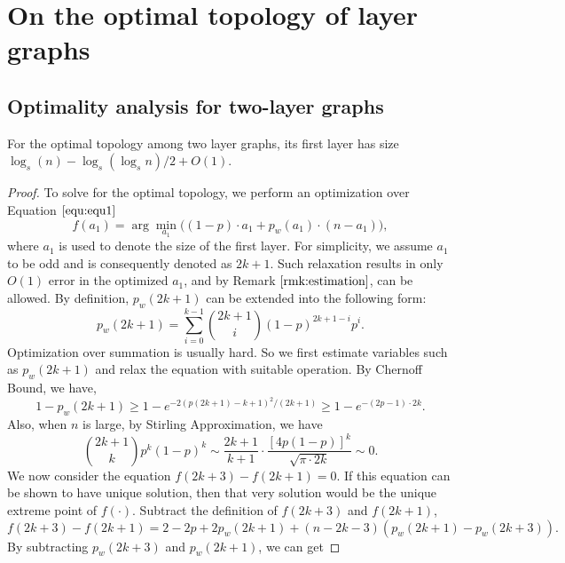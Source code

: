 \documentclass[a4paper,UKenglish]{lipics}
\theoremstyle{definition}
\begin{document}
\section{On the optimal topology of layer graphs}

\subsection{Optimality analysis for two-layer graphs} \label{subsec:two-layer optimal}
For the optimal topology among two layer graphs, its first layer has size $\log_{s}(n)-\log_s( \log_s n)/2 + O(1)$.
\begin{proof}
To solve for the optimal topology, we perform an optimization over Equation $\ref{equ:equ1}$
\begin{equation*}
	f(a_1) = \arg\min_{a_1} \Big( (1-p)\cdot a_1 + p_w(a_1)\cdot (n - a_1) \Big),
\end{equation*}
where $a_1$ is used to denote the size of the first layer.
For simplicity, we assume $a_1$ to be odd and is consequently denoted as $2k+1$.
Such relaxation results in only $O(1)$ error in the optimized $a_1$, and by Remark $\ref{rmk:estimation}$, can be allowed.
By definition, $p_w(2k+1)$ can be extended into the following form:
\begin{equation*}
	p_w(2k+1) 
= 
	\sum_{i=0}^{k-1} \binom{2k+1}{i} (1-p)^{2k+1-i} p^i.
\end{equation*}
Optimization over summation is usually hard.
So we first estimate variables such as $p_w(2k+1)$ and relax the equation with suitable operation.
By Chernoff Bound, we have,
\begin{equation*}
	1 - p_w(2k+1) 
\geq 
	1 - e^{-2(p(2k+1)-k+1)^2/(2k+1)}  
\geq 
 	1 - e^{-(2p-1)\cdot 2k}.
\end{equation*}
Also, when $n$ is large, by Stirling Approximation, we have
\begin{equation*}
	\binom{2k+1}{k}p^k(1-p)^k 
\sim 
	\frac{2k+1}{k+1} \cdot \frac{[4p(1-p)]^k}{\sqrt{\pi \cdot 2k}} 
\sim 
	0.
\end{equation*}
We now consider the equation $f(2k+3) - f(2k+1) = 0$. 
If this equation can be shown to have unique solution,
	then that very solution would be the unique extreme point of $f(\cdot)$.
Subtract the definition of $f(2k+3)$ and $f(2k+1)$,
\begin{equation} 
\label{equ:original}
 	f(2k+3) - f(2k+1)  
=	
	2 - 2p + 2p_w(2k+1) + (n - 2k - 3)(p_w(2k+1) - p_w(2k+3)). 
\end{equation}
By subtracting $p_w(2k+3)$ and $p_w(2k+1)$, we can get

\end{proof}
\end{document}
